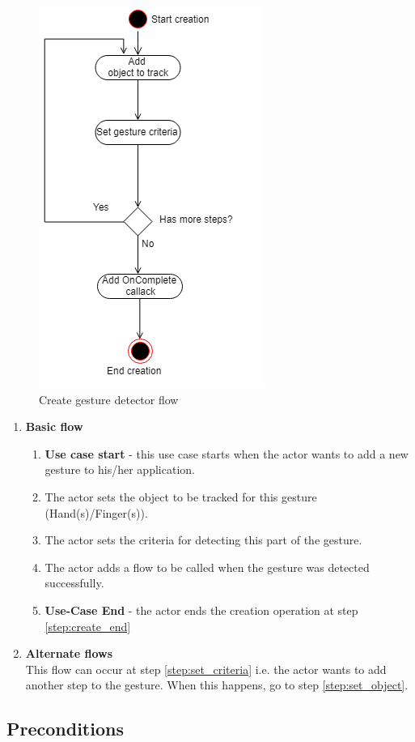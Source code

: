 \documentclass[12pt,a4paper,twoside]{report}
\begin{document}
\begin{figure}[h]
  \centering
  \includegraphics[width=0.4\linewidth]{img/UC_create.png}
  \caption{Create gesture detector flow}
  \label{fig:uc_create}
\end{figure}

\begin{enumerate}
  \item \textbf{Basic flow}
    \begin{enumerate}
      \item \textbf{Use case start} - this use case starts when the actor wants to add a new gesture to his/her application.
      \item The actor sets the object to be tracked for this gesture (Hand(s)/Finger(s)). \label{step:set_object}
      \item The actor sets the criteria for detecting this part of the gesture. \label{step:set_criteria}
      \item The actor adds a flow to be called when the gesture was detected successfully.
      \item \label{step:create_end} \textbf{Use-Case End} - the actor ends the creation operation at step \ref{step:create_end}
    \end{enumerate}
  \item \textbf{Alternate flows} \\
    This flow can occur at step \ref{step:set_criteria} i.e. the actor wants to add another step to the gesture. When this happens, go to step \ref{step:set_object}.
\end{enumerate}

\subsection{Preconditions}
\end{document}
